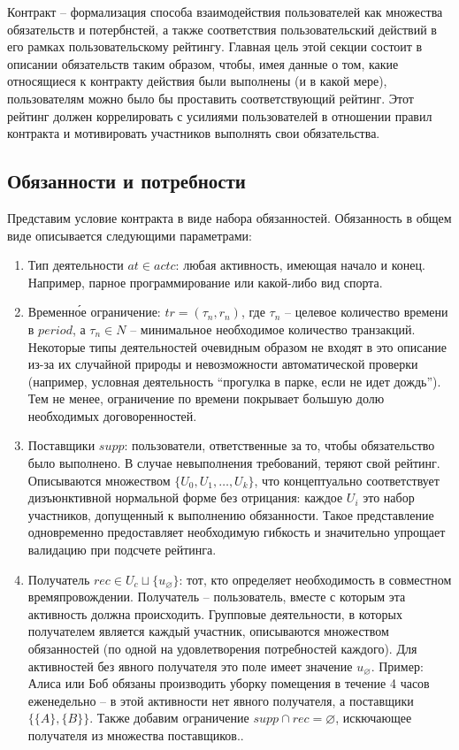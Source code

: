 \documentclass[specification,annotation]{itmo-student-thesis}
\begin{document}
Контракт -- формализация способа взаимодействия пользователей как
множества обязательств и потербнстей, а также соответствия
пользовательский действий в его рамках пользовательскому
рейтингу. Главная цель этой секции состоит в описании обязательств
таким образом, чтобы, имея данные о том, какие относящиеся к контракту
действия были выполнены (и в какой мере), пользователям можно было бы
проставить соответствующий рейтинг. Этот рейтинг должен коррелировать
с усилиями пользователей в отношении правил контракта и мотивировать
участников выполнять свои обязательства.

\subsection{Обязанности и потребности}

Представим условие контракта в виде набора обязанностей. Обязанность в
общем виде описывается следующими параметрами:

\begin{enumerate}
\item Тип деятельности $at \in actc$: любая активность, имеющая начало
  и конец. Например, парное программирование или какой-либо вид
  спорта.
\item Временн\'{о}е ограничение: $tr = (\tau_n, r_n)$, где $\tau_n$ --
  целевое количество времени в $period$, а $\tau_n \in N$ --
  минимальное необходимое количество транзакций. Некоторые типы
  деятельностей очевидным образом не входят в это описание из-за их
  случайной природы и невозможности автоматической проверки (например,
  условная деятельность ``прогулка в парке, если не идет дождь''). Тем
  не менее, ограничение по времени покрывает большую долю необходимых
  договоренностей.
\item Поставщики $supp$: пользователи, ответственные за то, чтобы
  обязательство было выполнено. В случае невыполнения требований,
  теряют свой рейтинг. Описываются множеством $\{U_0,
  U_1,\ldots,U_k\}$, что концептуально соответствует
  дизъюнктивной нормальной форме без отрицания: каждое $U_i$ это
  набор участников, допущенный к выполнению обязанности. Такое
  представление одновременно предоставляет необходимую гибкость и
  значительно упрощает валидацию при подсчете рейтинга.
\item Получатель $rec \in U_c \sqcup \{u_{\varnothing}\}$: тот, кто
  определяет необходимость в совместном времяпровождении. Получатель
  -- пользователь, вместе с которым эта активность должна
  происходить. Групповые деятельности, в которых получателем является
  каждый участник, описываются множеством обязанностей (по одной на
  удовлетворения потребностей каждого). Для активностей без явного
  получателя это поле имеет значение $u_{\varnothing}$. Пример: Алиса
  или Боб обязаны производить уборку помещения в течение 4 часов
  еженедельно -- в этой активности нет явного получателя, а поставщики
  $\{\{A\}, \{B\}\}$. Также добавим ограничение $supp \cap rec =
  \varnothing$, искючающее получателя из множества поставщиков..
\end{enumerate}
\end{document}
